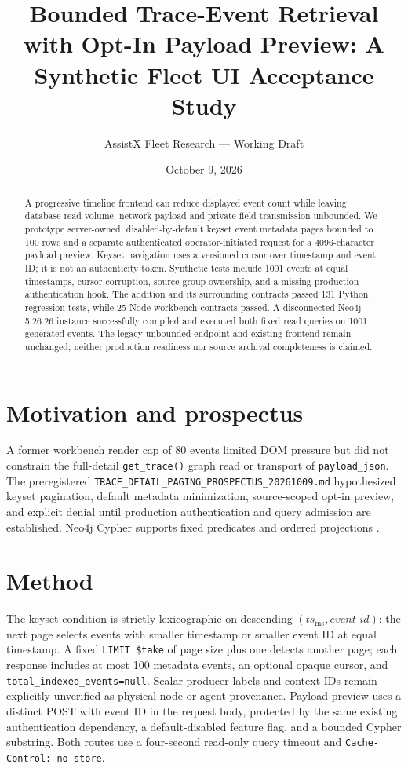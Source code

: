 \documentclass[11pt]{article}
\title{Bounded Trace-Event Retrieval with Opt-In Payload Preview: A Synthetic Fleet UI Acceptance Study}
\author{AssistX Fleet Research --- Working Draft}
\date{October 9, 2026}
\begin{document}
\maketitle
\begin{abstract}
A progressive timeline frontend can reduce displayed event count while leaving
database read volume, network payload and private field transmission unbounded.
We prototype server-owned, disabled-by-default keyset event metadata pages
bounded to 100 rows and a separate authenticated operator-initiated request for
a 4096-character payload preview. Keyset navigation uses a versioned cursor
over timestamp and event ID; it is not an authenticity token. Synthetic tests
include 1001 events at equal timestamps, cursor corruption, source-group
ownership, and a missing production authentication hook. The addition and
its surrounding contracts passed 131 Python regression tests, while 25 Node
workbench contracts passed. A disconnected Neo4j 5.26.26 instance successfully
compiled and executed both fixed read queries on 1001 generated events. The
legacy unbounded endpoint and existing frontend remain unchanged; neither
production readiness nor source archival completeness is claimed.
\end{abstract}
\section{Motivation and prospectus}
A former workbench render cap of 80 events limited DOM pressure but did not
constrain the full-detail \texttt{get\_trace()} graph read or transport of
\texttt{payload\_json}. The preregistered \texttt{TRACE\_DETAIL\_PAGING\_PROSPECTUS\_20261009.md}
hypothesized keyset pagination, default metadata minimization, source-scoped
opt-in preview, and explicit denial until production authentication and query
admission are established. Neo4j Cypher supports fixed predicates and ordered
projections \cite{cypher}.
\section{Method}
The keyset condition is strictly lexicographic on descending $(ts_{\mathrm{ms}},
event\_id)$: the next page selects events with smaller timestamp or smaller
event ID at equal timestamp. A fixed \texttt{LIMIT \$take} of page size plus
one detects another page; each response includes at most 100 metadata events,
an optional opaque cursor, and \texttt{total\_indexed\_events=null}. Scalar
producer labels and context IDs remain explicitly unverified as physical node
or agent provenance. Payload preview uses a distinct POST with event ID in
the request body, protected by the same existing authentication dependency,
a default-disabled feature flag, and a bounded Cypher substring. Both routes
use a four-second read-only query timeout and \texttt{Cache-Control: no-store}.
\end{document}
